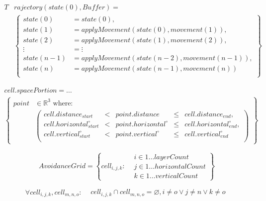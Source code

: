 \documentclass[a4paper,narrowmargins,12pt,twoside,openright,onehalfspaced,singlespacednotes]{fcup-thesis}
\theoremstyle{plain}
\theoremstyle{plain}
\theoremstyle{remark}
\newcommand{\R}{\mathbb{R}}
\begin{document}
	\setcounter{chapter}{6}
	\setcounter{equation}{12}	
	\begin{equation}\label{eq:ourTrajectoryEvolution}
		\begin{aligned}
		T&rajectory(state(0),Buffer)=\\
			&\left\{
			\begin{aligned}
				state(0) &= state(0),\\
				state(1) &= apply Movement\left(state(0), movement(1)\right),  \\
				state(2) &= apply Movement\left(state(1), movement(2)\right),  \\
				 \vdots  &= \vdots\\
				state(n-1) &= apply Movement\left(state(n-2), movement(n-1)\right),  \\
				state(n)   &= apply Movement\left(state(n-1), movement(n)\right)  \\
			\end{aligned}
			\right\}
		\end{aligned}
	\end{equation}
	
	
	\setcounter{chapter}{6}
	\setcounter{equation}{14}
	\begin{multline}\label{eq:boundedSpaceCell}
        cell.space Portion = \dots\\
            \left \{
                \begin{aligned}
                point& \in \R^3 \text{ where}:\\
                    &\left(\begin{aligned}
                        cell.distance_{start} &<& point.distance &\le& cell.distance_{end},\\
                        cell.horizontal^\circ_{start} &<& point.horizontal^\circ &\le&  cell.horizontal^\circ_{end},\\
                        cell.vertical^\circ_{start} &<& point.vertical^\circ &\le& cell.vertical^\circ_{end}\\
                    \end{aligned}\right)
                \end{aligned}
            \right\}
    \end{multline}
	
	\setcounter{chapter}{6}
	\setcounter{equation}{19}
	\begin{equation}\label{eq:avoidanceGridCellSpace}
    Avoidance Grid = \left\{
    					cell_{i,j,k}:
    					\begin{aligned}
    						& i \in 1 \dots layer Count\\
    						& j \in 1 \dots horizontal Count\\
    						& k \in 1 \dots vertical Count
    					\end{aligned} 
                     \right\}
	\end{equation}
	
	\setcounter{chapter}{6}
	\setcounter{equation}{20}
	\begin{equation}
		\forall cell_{i,j,k}, cell_{m,n,o}:
		\begin{aligned}
		    &cell_{i,j,k}\cap cell_{m,n,o} = \varnothing,
		    i \neq o \lor j \neq n \lor k \neq o
		\end{aligned}
	\end{equation}
\end{document}
